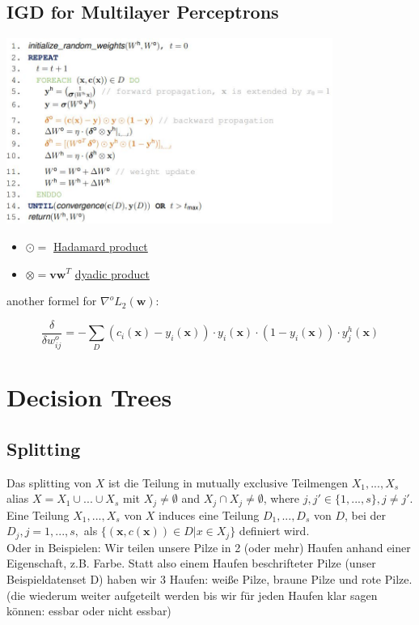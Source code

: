 \documentclass[11pt,a4paper]{article}
\begin{document}
\begin{flushleft}
\subsection{IGD for Multilayer Perceptrons}
\includegraphics[width=0.8\textwidth]{MultiIGD}
\begin{itemize}
\item $\odot = $ \href{https://en.wikipedia.org/wiki/Hadamard_product_(matrices)}{Hadamard product}
\item $ \otimes  = \textbf{vw}^T $ \href{https://en.wikipedia.org/wiki/Dyadics}{dyadic product}
\end{itemize}
another formel for $ \nabla^o L_2 (\textbf{w})$: 

$$ \frac{\delta}{\delta w^o _ {ij}} = - \sum_D (c_i (\textbf{x}) - y_i(\textbf{x})) \cdot y_i(\textbf{x}) \cdot (1- y_i (\textbf{x})) \cdot y_j^h(\textbf{x}) $$ 

\section{Decision Trees}
\subsection{Splitting}

Das splitting von $X$ ist die Teilung in mutually exclusive Teilmengen $X_1, . . . , X_s$ alias $X = X_1 \cup ... \cup X_s$ mit $X_j \neq \emptyset$ and $X_j \cap X_j \neq \emptyset$, where $j, j' \in \{1, . . . , s\}, j \neq j'$.
Eine Teilung $X_1, ... , X_s$ von $X$ induces eine Teilung $D_1, . . . , D_s$ von $D$, bei der $D_j, j = 1, ... , s,$ als $\{(\textbf{x}, c(\textbf{x})) \in D | x \in X_j\}$ definiert wird. \\
Oder in Beispielen: Wir teilen unsere Pilze in 2 (oder mehr) Haufen anhand einer Eigenschaft, z.B. Farbe. Statt also einem Haufen beschrifteter Pilze (unser Beispieldatenset D) haben wir 3 Haufen: weiße Pilze, braune Pilze und rote Pilze. (die wiederum weiter aufgeteilt werden bis wir für jeden Haufen klar sagen können: essbar oder nicht essbar)\\


\end{flushleft}
\end{document}
